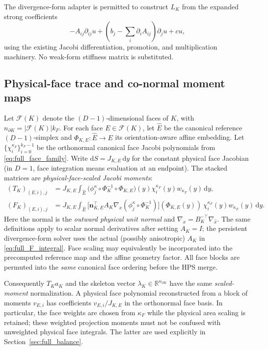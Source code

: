\documentclass[11pt]{article}
\newcommand{\dd}{\mathrm d}
\begin{document}
The divergence-form adapter is permitted to construct $L_K$ from the
expanded strong coefficients
\begin{equation}\label{eq:full_expanded}
 -A_{ij}\partial_{ij}u
 +\left(b_j-\sum_i\partial_iA_{ij}\right)\partial_ju+cu,
\end{equation}
using the existing Jacobi differentiation, promotion, and
multiplication machinery.  No weak-form stiffness matrix is substituted.

\subsection{Physical-face trace and co-normal moment maps}
\label{sec:full_trace_flux_def}
Let $\mathcal F(K)$ denote the $(D-1)$-dimensional faces of $K$, with
$n_{\partial K}=|\mathcal F(K)|k_F$.  For each face $E\in\mathcal F(K)$,
let $\widehat E$ be the canonical reference $(D-1)$-simplex and
$\Phi_{K,E}:\widehat E\to E$ its orientation-aware affine embedding.
Let $\{\chi_i^{\kappa_F}\}_{i=0}^{k_F-1}$ be the orthonormal canonical
face Jacobi polynomials from \eqref{eq:full_face_family}.  Write
$\mathrm dS=J_{K,E}\,\mathrm dy$ for the constant physical face Jacobian
(in $D=1$, face integration means evaluation at an endpoint).
The stacked matrices are \emph{physical-face-scaled Jacobi moments}:
\begin{align}
 (T_K)_{(E,i),j}
 &=J_{K,E}\int_{\widehat E}
     \bigl(\phi_j^\kappa\circ\Phi_K^{-1}\circ\Phi_{K,E}\bigr)(y)
     \chi_i^{\kappa_F}(y)w_{\kappa_F}(y)\,\dd y,
 \label{eq:full_T_integral}\\
 (F_K)_{(E,i),j}
 &=J_{K,E}\int_{\widehat E}
     \bigl[\bm n_{K,E}^{\top}A_K\nabla_x
       (\phi_j^\kappa\circ\Phi_K^{-1})\bigr]
       (\Phi_{K,E}(y))\,
     \chi_i^{\kappa_F}(y)w_{\kappa_F}(y)\,\dd y.
 \label{eq:full_F_integral}
\end{align}
Here the normal is the \emph{outward physical unit normal} and
$\nabla_x=B_K^{-\top}\nabla_{\widehat x}$.  The same definitions
apply to scalar normal derivatives after setting $A_K=I$; the
persistent divergence-form solver uses the actual (possibly anisotropic)
$A_K$ in \eqref{eq:full_F_integral}.  Face scaling may equivalently be
incorporated into the precomputed reference map and the affine
geometry factor.  All face blocks are permuted into the \emph{same}
canonical face ordering before the HPS merge.

Consequently $T_Ka_K$ and the skeleton vector
$\lambda_K\in\mathbb R^{n_{\partial K}}$ have the same \emph{scaled-moment}
normalization.  A physical face polynomial reconstructed from a block
of moments $v_{E,i}$ has coefficients $v_{E,i}/J_{K,E}$ in the
orthonormal face basis.  In particular, the face weights are chosen
from $\kappa_F$ while the physical area scaling is retained; these
weighted projection moments must not be confused with unweighted
physical face integrals.  The latter are used explicitly in
Section~\ref{sec:full_balance}.
\end{document}
